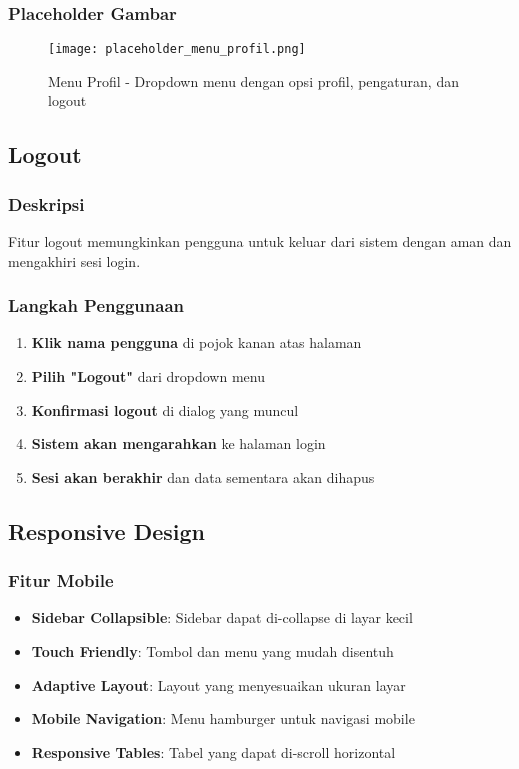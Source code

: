\documentclass[12pt,a4paper]{article}
\begin{document}
\subsubsection{Placeholder Gambar}
\begin{figure}[H]
\centering
\texttt{[image: placeholder\_menu\_profil.png]}
\caption{Menu Profil - Dropdown menu dengan opsi profil, pengaturan, dan logout}
\label{fig:menu_profil}
\end{figure}

\subsection{Logout}

\subsubsection{Deskripsi}
Fitur logout memungkinkan pengguna untuk keluar dari sistem dengan aman dan mengakhiri sesi login.

\subsubsection{Langkah Penggunaan}
\begin{enumerate}
\item \textbf{Klik nama pengguna} di pojok kanan atas halaman
\item \textbf{Pilih "Logout"} dari dropdown menu
\item \textbf{Konfirmasi logout} di dialog yang muncul
\item \textbf{Sistem akan mengarahkan} ke halaman login
\item \textbf{Sesi akan berakhir} dan data sementara akan dihapus
\end{enumerate}

\subsection{Responsive Design}

\subsubsection{Fitur Mobile}
\begin{itemize}
\item \textbf{Sidebar Collapsible}: Sidebar dapat di-collapse di layar kecil
\item \textbf{Touch Friendly}: Tombol dan menu yang mudah disentuh
\item \textbf{Adaptive Layout}: Layout yang menyesuaikan ukuran layar
\item \textbf{Mobile Navigation}: Menu hamburger untuk navigasi mobile
\item \textbf{Responsive Tables}: Tabel yang dapat di-scroll horizontal
\end{itemize}
\end{document}
